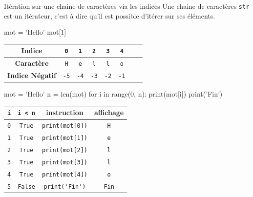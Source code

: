 	
	\begin{easybox}{Itération sur une chaine de caractères via les indices}{}
	Une chaine de caractères \verb+str+ est un itérateur, c'est à dire qu'il est possible d'itérer sur ses éléments.
	
	\begin{minipage}[b]{0.48\linewidth}
		\begin{ConsolePythontex}[TaillePolice=\normalsize, Label=false]{}
	mot = 'Hello'
	mot[1]
			\end{ConsolePythontex}
	\end{minipage}\hfill
	\begin{minipage}[b]{0.48\linewidth}
		\begin{center}
			\begin{tabular}{|c|c|c|c|c|c|c|c|}
			\hline
			\textbf{Indice} & \verb+0+ & \verb+1+ & \verb+2+ & \verb+3+ & \verb+4+ \\
			\hline
			\textbf{Caractère} & \verb+H+ & \verb+e+ & \verb+l+ & \verb+l+ & \verb+o+  \\
			\hline
			\textbf{Indice Négatif} & \verb+-5+ & \verb+-4+ & \verb+-3+ & \verb+-2+ & \verb+-1+ \\
			\hline
			\end{tabular}
		\end{center}
	\end{minipage}
	

	\begin{minipage}{0.48\linewidth}
	\medskip
			\begin{CodePythontexAlt}[TaillePolice=\normalsize, Largeur=1\linewidth,Centre,PremLigne=1, Lignes=false,]{}
	mot = 'Hello'
	n = len(mot)
	for i in range(0, n):
		print(mot[i])
	print('Fin')
			
	\end{CodePythontexAlt}
	\end{minipage}\hfill
	\begin{minipage}{0.48\linewidth}
		\begin{center}
			\renewcommand{\arraystretch}{1}
			\begin{tabular}{|c|c|c|c|}
				\hline
				\verb+i+  & \verb+i < n+ & instruction & affichage \\ \hline{}
				\verb+0+  & \verb+True+ & \verb+print(mot[0])+ & \verb+H+ \\ \hline{}
				\verb+1+  & \verb+True+ & \verb+print(mot[1])+ & \verb+e+ \\ \hline{}
				\verb+2+  & \verb+True+ & \verb+print(mot[2])+ & \verb+l+ \\ \hline{}
				\verb+3+  & \verb+True+ & \verb+print(mot[3])+ & \verb+l+ \\ \hline{}
				\verb+4+  & \verb+True+ & \verb+print(mot[4])+ & \verb+o+ \\ \hline{}
				\verb+5+  & \verb+False+ & \verb+print('Fin')+ & \verb+Fin+ \\ \hline
			\end{tabular}	
			\end{center}
	\end{minipage}
	\end{easybox}
	
